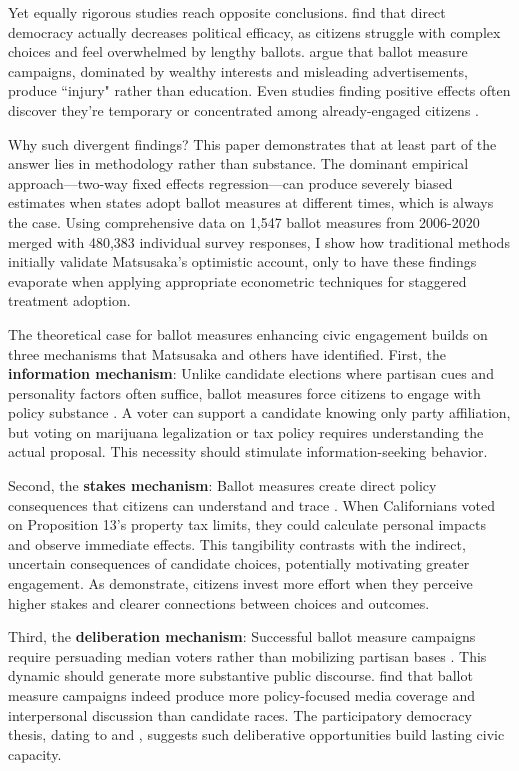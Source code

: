 \documentclass[12pt,letterpaper,oneside]{book}
\begin{document}
Yet equally rigorous studies reach opposite conclusions. \citet{dyck2009grasping} find that direct democracy actually decreases political efficacy, as citizens struggle with complex choices and feel overwhelmed by lengthy ballots. \citet{schlozman1984injury} argue that ballot measure campaigns, dominated by wealthy interests and misleading advertisements, produce ``injury" rather than education. Even studies finding positive effects often discover they're temporary \citep{nicholson2003agenda} or concentrated among already-engaged citizens \citep{smith2004strategic}.

Why such divergent findings? This paper demonstrates that at least part of the answer lies in methodology rather than substance. The dominant empirical approach—two-way fixed effects regression—can produce severely biased estimates when states adopt ballot measures at different times, which is always the case. Using comprehensive data on 1,547 ballot measures from 2006-2020 merged with 480,383 individual survey responses, I show how traditional methods initially validate Matsusaka's optimistic account, only to have these findings evaporate when applying appropriate econometric techniques for staggered treatment adoption.

The theoretical case for ballot measures enhancing civic engagement builds on three mechanisms that Matsusaka and others have identified. First, the \textbf{information mechanism}: Unlike candidate elections where partisan cues and personality factors often suffice, ballot measures force citizens to engage with policy substance \citep{matsusaka1995economic, bowler1998demanding}. A voter can support a candidate knowing only party affiliation, but voting on marijuana legalization or tax policy requires understanding the actual proposal. This necessity should stimulate information-seeking behavior.

Second, the \textbf{stakes mechanism}: Ballot measures create direct policy consequences that citizens can understand and trace \citep{matsusaka2004many}. When Californians voted on Proposition 13's property tax limits, they could calculate personal impacts and observe immediate effects. This tangibility contrasts with the indirect, uncertain consequences of candidate choices, potentially motivating greater engagement. As \citet{gerber1999political} demonstrate, citizens invest more effort when they perceive higher stakes and clearer connections between choices and outcomes.

Third, the \textbf{deliberation mechanism}: Successful ballot measure campaigns require persuading median voters rather than mobilizing partisan bases \citep{matsusaka2020let}. This dynamic should generate more substantive public discourse. \citet{gastil2000voters} find that ballot measure campaigns indeed produce more policy-focused media coverage and interpersonal discussion than candidate races. The participatory democracy thesis, dating to \citet{pateman1970participation} and \citet{barber1984strong}, suggests such deliberative opportunities build lasting civic capacity.
\end{document}
